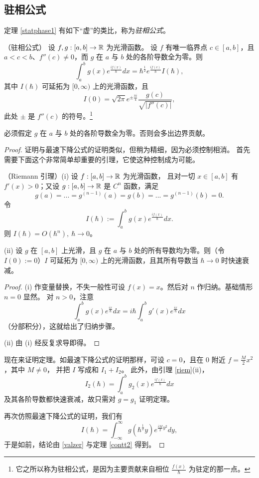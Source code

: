 \subsection{驻相公式}
定理 \ref{statphase1} 有如下“虚”的类比，称为\emph{驻相公式}。
\begin{theorem}\label{statphase2}（驻相公式）
设 $f,g: [a,b]\to \Bbb R$ 为光滑函数。
设 $f$ 有唯一临界点 $c\in [a,b]$，且 $a<c<b$、$f''(c)\ne 0$，而 $g$ 在 $a$ 与 $b$ 处的各阶导数全为零。则
$$
\int_a^bg(x)e^{\frac{if(x)}{\hbar}}dx=\hbar^{\frac{1}{2}}e^{\frac{if(c)}{\hbar}}I(\hbar),
$$
其中 $I(\hbar)$ 可延拓为 $[0,\infty)$ 上的光滑函数，且
$$
I(0)=\sqrt{2\pi}e^{\pm\frac{\pi i}{4}}\frac{g(c)}{\sqrt{|f''(c)|}},
$$
此处 $\pm$ 是 $f''(c)$ 的符号。\footnote{它之所以称为驻相公式，是因为主要贡献来自相位
$\frac{f(x)}{\hbar}$ 为驻定的那一点。}     
\end{theorem}

\begin{remark} 必须假定 $g$ 在 $a$ 与 $b$ 处的各阶导数全为零。否则会多出边界贡献。
\end{remark} 

\begin{proof} 证明与最速下降公式的证明类似，但稍为精细，因为必须控制相消。
首先需要下面这个非常简单却重要的引理，它使这种控制成为可能。

\begin{lemma}\label{riem}（Riemann 引理）(i) 设 $f: [a,b]\to \Bbb R$ 为光滑函数，
且对一切 $x\in [a,b]$ 有 $f'(x)>0$；又设 $g: [a,b]\to \Bbb R$ 是 $C^n$ 函数，满足
$$
g(a)=...=g^{(n-1)}(a)=g(b)=...=g^{(n-1)}(b)=0.
$$
令
$$
I(\hbar):=\int_a^b g(x)e^{\frac{if(x)}{\hbar}}dx.
$$
则 $I(\hbar)=O(\hbar^{n}),\ \hbar\to 0$。

(ii) 设 $g$ 在 $[a,b]$ 上光滑，且 $g$ 在 $a$ 与 $b$ 处的所有导数均为零。则（令 $I(0):=0$）$I$
可延拓为 $[0,\infty)$ 上的光滑函数，且其所有导数当 $\hbar\to 0$ 时快速衰减。
\end{lemma} 

\begin{proof} (i) 作变量替换，不失一般性可设 $f(x)=x$。然后对 $n$ 作归纳。基础情形 $n=0$ 显然。
对 $n>0$，注意
 $$
\int_a^b g(x)e^{\frac{ix}{\hbar}}dx=i\hbar \int_a^b g'(x)e^{\frac{ix}{\hbar}}dx
$$
（分部积分），这就给出了归纳步骤。

(ii) 由 (i) 经反复求导即得。
\end{proof} 

现在来证明定理。如最速下降公式的证明那样，可设 $c=0$，且在 $0$ 附近 $f=\frac{M}{2}x^2$，其中 $M\ne 0$，
并把 $I$ 写成和 $I_1+I_2$。
此外，由引理 \ref{riem}(ii)，
$$
I_2(\hbar)=\int_a^bg_2(x)e^{\frac{if(x)}{\hbar}}dx
$$
及其各阶导数都快速衰减，故只需对 $g=g_1$ 证明定理。

再次仿照最速下降公式的证明，我们有
\begin{equation}\label{inte12}
I(\hbar)=\int_{-\infty}^\infty
g(\hbar^{\frac{1}{2}} y)e^{\frac{iM}{2}y^2}dy,
\end{equation}
于是如前，结论由 \eqref{valzer} 与定理 \ref{contt2} 得到。
\end{proof} 

